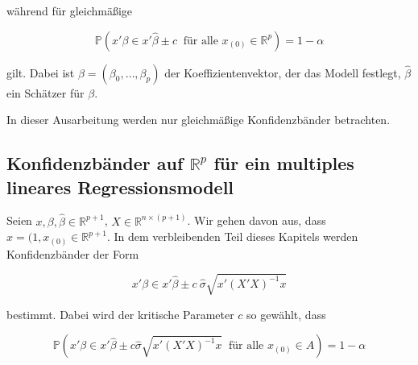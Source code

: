 \documentclass[12pt,a4paper]{article}
\theoremstyle{definition}
\newtheorem{Beispiel}[Definition]{Beispiel}
\theoremstyle{definition}
\theoremstyle{definition}
\theoremstyle{definition}
\begin{document}
während für gleichmäßige 

\begin{equation*}
\mathbb{P}(x'\beta \in x' \hat{\beta} \pm c ~ \text{ für alle } x_{(0)} \in \mathbb{R}^{p}) = 1-\alpha
\end{equation*}

gilt. Dabei ist $\beta=(\beta_{0}, \ldots, \beta_{p})$ der Koeffizientenvektor, der das Modell festlegt, $\hat{\beta}$ ein Schätzer für $\beta$. 

In dieser Ausarbeitung werden nur gleichmäßige Konfidenzbänder betrachten.



%
%
%
%

 

\subsection{Konfidenzbänder auf $\mathbb{R}^{p}$ für ein multiples lineares Regressionsmodell}
\label{Konfidenzbaender auf R fuer ein multiples lineares Regressionsmodell}
Seien  $x,\beta, \hat{\beta}  \in \mathbb{R}^{p+1}$, $X \in \mathbb{R}^{n \times (p+1)}$. Wir gehen davon aus, dass $x = (1, x_{(0)} \in \mathbb{R}^{p+1}$. In dem verbleibenden Teil dieses Kapitels werden Konfidenzbänder der Form

\begin{equation*} \label{KB_allgemein}
x' \beta \in x'\hat{\beta} \pm c ~ \hat{\sigma}\sqrt{x'(X'X)^{-1}x}
\end{equation*}

bestimmt. Dabei wird der kritische Parameter $c$ so gewählt, dass 

\begin{equation*}
\mathbb{P}(x' \beta \in x'\hat{\beta} \pm c \hat{\sigma}\sqrt{x'(X'X)^{-1}x} ~ \text{ für alle } x_{(0)} \in A)=1-\alpha
\end{equation*}
\end{document}

